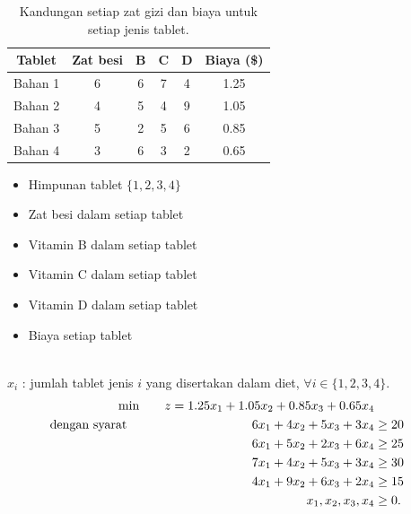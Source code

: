 \begin{table}[h!]
\begin{center}
\begin{tabular}{|c|c|c|c|c|c|}
\hline
Tablet & Zat besi & B & C & D & Biaya (\$) \\ \hline
Bahan 1 & 6 & 6 & 7 & 4 & 1.25 \\
Bahan 2 & 4 & 5 & 4 & 9 & 1.05 \\
Bahan 3 & 5 & 2 & 5 & 6 & 0.85 \\
Bahan 4 & 3 & 6 & 3 & 2 & 0.65 \\
\hline
\end{tabular}
\end{center}
\caption{Kandungan setiap zat gizi dan biaya untuk setiap jenis tablet.}\label{tab:pillContent}%
\end{table}

\begin{solution}
\smallskip {}
\begin{itemize}
\item Himpunan tablet $\{1,2,3,4\}$
\end{itemize}

\smallskip {}
\begin{itemize}
\item Zat besi dalam setiap tablet
\item Vitamin B dalam setiap tablet
\item Vitamin C dalam setiap tablet
\item Vitamin D dalam setiap tablet
\item Biaya setiap tablet
\end{itemize}

\smallskip  {} \\
$x_i$ : jumlah tablet jenis $i$ yang disertakan dalam diet, $\forall i \in \{1,2,3,4\}$.\\

\smallskip  {}
\begin{align*}
\min \quad && z = 1.25x_1 + 1.05x_2 + 0.85x_3 + 0.65x_4 \\
\mbox{dengan syarat}\quad \quad &&  6x_1 + 4x_2 + 5x_3 + 3x_4 &\ge 20  \\
&& 6x_1 + 5x_2 + 2x_3 + 6x_4 &\ge 25 \\
&& 7x_1 + 4x_2 + 5x_3 + 3x_4 &\ge 30 \\
&& 4x_1 + 9x_2 + 6x_3 + 2x_4 &\ge 15  \\
&& x_1, x_2, x_3, x_4 &\ge 0. 
\end{align*}
\end{solution}

